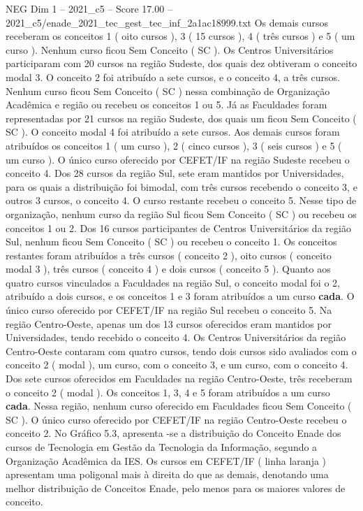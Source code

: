 \begin{textsample}{NEG Dim 1 – 2021\_c5 – Score 17.00 – 2021\_c5/enade\_2021\_tec\_gest\_tec\_inf\_2a1ac18999.txt}
Os demais cursos receberam os conceitos 1 ( oito cursos ), 3 ( 15 cursos ), 4 ( três cursos ) e 5 ( um curso ).
Nenhum curso ficou Sem Conceito ( SC ).
Os Centros Universitários participaram com 20 cursos na região Sudeste, dos quais dez obtiveram o conceito modal 3.
O conceito 2 foi atribuído a sete cursos, e o conceito 4, a três cursos.
Nenhum curso ficou Sem Conceito ( SC ) nessa combinação de Organização Acadêmica e região ou recebeu os conceitos 1 ou 5.
Já as Faculdades foram representadas por 21 cursos na região Sudeste, dos quais um ficou Sem Conceito ( SC ).
O conceito modal 4 foi atribuído a sete cursos.
Aos demais cursos foram atribuídos os conceitos 1 ( um curso ), 2 ( cinco cursos ), 3 ( seis cursos ) e 5 ( um curso ).
O único curso oferecido por CEFET/IF na região Sudeste recebeu o conceito 4.
Dos 28 cursos da região Sul, sete eram mantidos por Universidades, para os quais a distribuição foi bimodal, com três cursos recebendo o conceito 3, e outros 3 cursos, o conceito 4.
O curso restante recebeu o conceito 5.
Nesse tipo de organização, nenhum curso da região Sul ficou Sem Conceito ( SC ) ou recebeu os conceitos 1 ou 2.
Dos 16 cursos participantes de Centros Universitários da região Sul, nenhum ficou Sem Conceito ( SC ) ou recebeu o conceito 1.
Os conceitos restantes foram atribuídos a três cursos ( conceito 2 ), oito cursos ( conceito modal 3 ), três cursos ( conceito 4 ) e dois cursos ( conceito 5 ).
Quanto aos quatro cursos vinculados a Faculdades na região Sul, o conceito modal foi o 2, atribuído a dois cursos, e os conceitos 1 e 3 foram atribuídos a um curso \textbf{cada}.
O único curso oferecido por CEFET/IF na região Sul recebeu o conceito 5.
Na região Centro-Oeste, apenas um dos 13 cursos oferecidos eram mantidos por Universidades, tendo recebido o conceito 4.
Os Centros Universitários da região Centro-Oeste contaram com quatro cursos, tendo dois cursos sido avaliados com o conceito 2 ( modal ), um curso, com o conceito 3, e um curso, com o conceito 4.
Dos sete cursos oferecidos em Faculdades na região Centro-Oeste, três receberam o conceito 2 ( modal ).
Os conceitos 1, 3, 4 e 5 foram atribuídos a um curso \textbf{cada}.
Nessa região, nenhum curso oferecido em Faculdades ficou Sem Conceito ( SC ).
O único curso oferecido por CEFET/IF na região Centro-Oeste recebeu o conceito 2.
No Gráfico 5.3, apresenta -se a distribuição do Conceito Enade dos cursos de Tecnologia em Gestão da Tecnologia da Informação, segundo a Organização Acadêmica da IES.
Os cursos em CEFET/IF ( linha laranja ) apresentam uma poligonal mais à direita do que as demais, denotando uma melhor distribuição de Conceitos Enade, pelo menos para os maiores valores de conceito.

\end{textsample}
